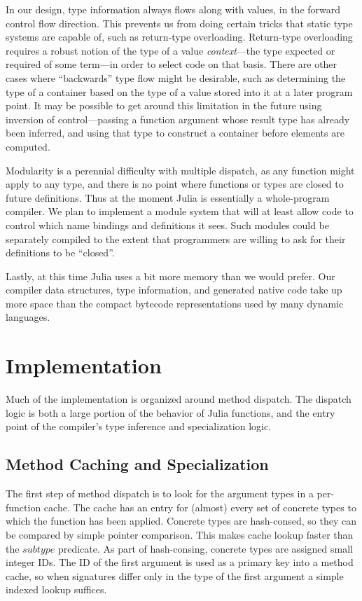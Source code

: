 \documentclass[9pt]{sigplanconf}
\begin{document}
In our design, type information always flows along with values, in the
forward control flow direction. This prevents us from doing certain tricks
that static type systems are capable of, such as return-type overloading.
Return-type overloading requires a robust notion of the type of a value
\emph{context}---the type expected or required of some term---in order to
select code on that basis. There are other cases where ``backwards'' type
flow might be desirable, such as determining the type of a container based
on the type of a value stored into it at a later program point. It may be
possible to get around this limitation in the future using inversion of
control---passing a function argument whose result type has already been
inferred, and using that type to construct a container before elements are
computed.

Modularity is a perennial difficulty with multiple dispatch, as any
function might apply to any type, and there is no point where functions or
types are closed to future definitions. Thus at the moment Julia is
essentially a whole-program compiler. We plan to implement a module system
that will at least allow code to control which name bindings and definitions
it sees. Such modules could be separately compiled to the extent that
programmers are willing to ask for their definitions to be ``closed''.

Lastly, at this time Julia uses a bit more memory than we would prefer.
Our compiler data structures, type information, and generated native code
take up more space than the compact bytecode representations used by many
dynamic languages.


\section{Implementation}

Much of the implementation is organized around method dispatch. The dispatch
logic is both a large portion of the behavior of Julia functions, and the
entry point of the compiler's type inference and specialization logic.

\subsection{Method Caching and Specialization}

The first step of method dispatch is to look for the argument types in a
per-function cache. The cache has an entry for (almost) every set of concrete
types to which the function has been applied. Concrete types are hash-consed,
so they can be compared by simple pointer comparison. This makes cache lookup
faster than the $subtype$ predicate. As part of hash-consing, concrete types
are assigned small integer IDs. The ID of the first argument is used as a
primary key into a method cache, so when signatures differ only in the
type of the first argument a simple indexed lookup suffices.
\end{document}
